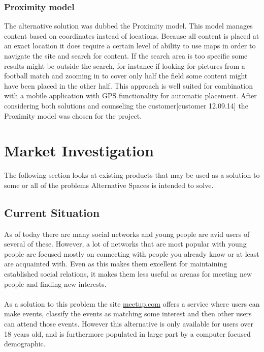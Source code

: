 \subsubsection{Proximity model}
The alternative solution was dubbed the Proximity model. This model manages content based on coordinates instead of locations. Because all content is placed at an exact location it does require a certain level of ability to use maps in order to navigate the site and search for content. If the search area is too specific some results might be outside the search, for instance if looking for pictures from a football match and zooming in to cover only half the field some content might have been placed in the other half. This approach is well suited for combination with a mobile application with GPS functionality for automatic placement. After considering both solutions and counseling the customer[customer 12.09.14] the Proximity model was chosen for the project.

\section{Market Investigation}
\label{sec:PrelimMarket}

The following section looks at existing products that may be used as a solution to some or all of the problems Alternative Spaces is intended to solve.

\subsection{Current Situation}
\label{subsec:PrelimMarketSituation}
As of today there are many social networks and young people are avid users of several of these. However, a lot of networks that are most popular with young people are focused mostly on connecting with people you already know or at least are acquainted with. Even as this makes them excellent for maintaining established social relations, it makes them less useful as arenas for meeting new people and finding new interests.

\paragraph{} As a solution to this problem the site \href{http://www.meetup.com}{meetup.com} offers a service where users can make events, classify the events as matching some interest and then other users can attend those events. However this alternative is only available for users over 18 years old, and is furthermore populated in large part by a computer focused demographic.

